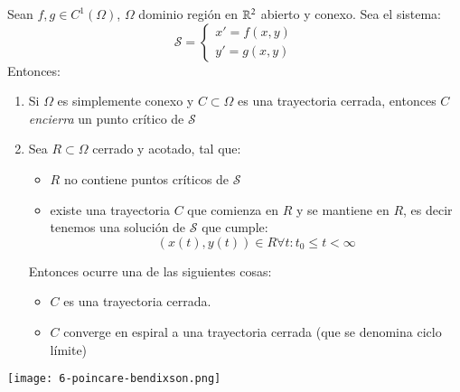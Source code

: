 \begin{thm}\label{pro:poincare-bendixson}
    Sean $f, g \in C^1(\Omega)$, $\Omega$ dominio región en $\mathbb{R}^2$ abierto y conexo. Sea el sistema:
    $$
        \mathcal{S} =
        \begin{cases}
            x' = f(x, y)\\
            y' = g(x, y)
        \end{cases}
    $$
    Entonces:
    \begin{enumerate}
        \item Si $\Omega$ es simplemente conexo y $C \subset \Omega$ es una trayectoria cerrada, entonces $C$ \textit{encierra} un punto crítico de $\mathcal{S}$
        \item Sea $R \subset \Omega$ cerrado y acotado, tal que:\\
            \begin{itemize}
                \item $R$ no contiene puntos críticos de $\mathcal{S}$
                \item existe una trayectoria $C$ que comienza en $R$ y se mantiene en $R$, es decir tenemos una solución de $\mathcal{S}$ que cumple:
                $$
                    (x(t), y(t)) \in R \forall t : t_0 \leq t < \infty
                $$
            \end{itemize}
            Entonces ocurre una de las siguientes cosas:
            \begin{itemize}
                \item $C$ es una trayectoria cerrada.
                \item $C$ converge en espiral a una trayectoria cerrada (que se denomina ciclo límite)
            \end{itemize}
    \end{enumerate}
    \begin{center}
        \texttt{[image: 6-poincare-bendixson.png]}
    \end{center}
\end{thm}
